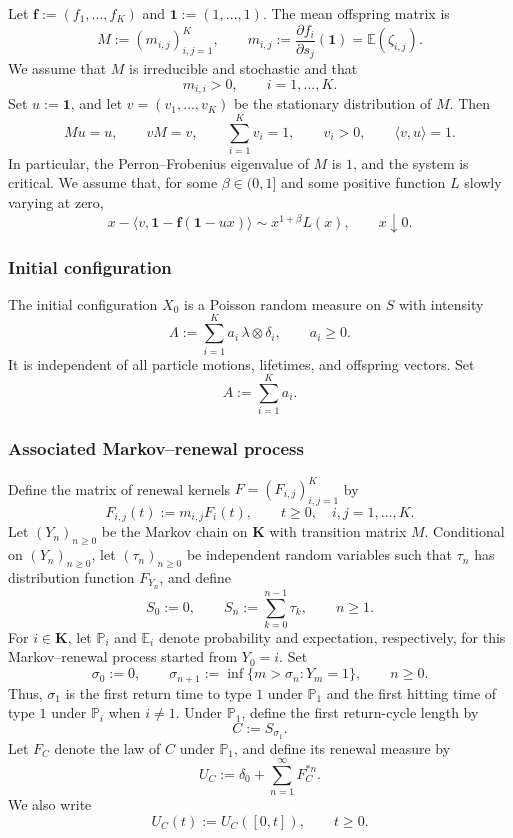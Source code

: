 \documentclass[reqno,final,11pt]{amsart}
\newcommand{\E}{\mathbb E}
\newcommand{\Pbb}{\mathbb P}
\newcommand{\Kk}{\mathbf K}
\newcommand{\one}{\mathbf 1}
\newcommand{\ip}[2]{\langle #1,#2\rangle}
\theoremstyle{plain}
\theoremstyle{definition}
\theoremstyle{remark}
\numberwithin{equation}{section}
\begin{document}
Let \(\mathbf f:=(f_1,\dots,f_K)\) and \(\one:=(1,\dots,1)\). The mean offspring matrix is
\[
  M:=(m_{i,j})_{i,j=1}^K,
  \qquad
  m_{i,j}:=\frac{\partial f_i}{\partial s_j}(\one)
  =\E(\zeta_{i,j}).
\]
We assume that \(M\) is irreducible and stochastic and that
\begin{equation}\label{eq:positive-diagonal}
  m_{i,i}>0,
  \qquad i=1,\dots,K.
\end{equation}
Set \(u:=\one\), and let \(v=(v_1,\dots,v_K)\) be the stationary distribution of \(M\). Then
\[
  Mu=u,\qquad vM=v,\qquad
  \sum_{i=1}^K v_i=1,\qquad v_i>0,\qquad
  \ip{v}{u}=1.
\]
In particular, the Perron--Frobenius eigenvalue of \(M\) is \(1\), and the system is critical. We assume that, for some \(\beta\in(0,1]\) and some positive function \(L\) slowly varying at zero,
\begin{equation}\label{eq:branching-condition}
  x-\ip{v}{\one-\mathbf f(\one-ux)}
  \sim x^{1+\beta}L(x),
  \qquad x\downarrow0.
\end{equation}

\subsubsection{Initial configuration}

The initial configuration \(X_0\) is a Poisson random measure on \(S\) with intensity
\begin{equation}\label{eq:initial-intensity}
  \Lambda:=\sum_{i=1}^K a_i\,\lambda\otimes\delta_i,
  \qquad a_i\ge0.
\end{equation}
It is independent of all particle motions, lifetimes, and offspring vectors. Set
\begin{equation}\label{eq:A-total}
  A:=\sum_{i=1}^K a_i.
\end{equation}

\subsubsection{Associated Markov--renewal process}
\label{sec:mixed-renewal-framework}

Define the matrix of renewal kernels \(F=(F_{i,j})_{i,j=1}^K\) by
\[
  F_{i,j}(t):=m_{i,j}F_i(t),
  \qquad t\ge0,\quad i,j=1,\dots,K.
\]
Let \((Y_n)_{n\ge0}\) be the Markov chain on \(\Kk\) with transition matrix \(M\). Conditional on \((Y_n)_{n\ge0}\), let \((\tau_n)_{n\ge0}\) be independent random variables such that \(\tau_n\) has distribution function \(F_{Y_n}\), and define
\[
  S_0:=0,\qquad
  S_n:=\sum_{k=0}^{n-1}\tau_k,
  \qquad n\ge1.
\]
For \(i\in\Kk\), let \(\Pbb_i\) and \(\E_i\) denote probability and expectation, respectively, for this Markov--renewal process started from \(Y_0=i\). Set
\[
  \sigma_0:=0,\qquad
  \sigma_{n+1}:=\inf\{m>\sigma_n:Y_m=1\},
  \qquad n\ge0.
\]
Thus, \(\sigma_1\) is the first return time to type \(1\) under \(\Pbb_1\) and the first hitting time of type \(1\) under \(\Pbb_i\) when \(i\ne1\). Under \(\Pbb_1\), define the first return-cycle length by
\[
  C:=S_{\sigma_1}.
\]
Let \(F_C\) denote the law of \(C\) under \(\Pbb_1\), and define its renewal measure by
\[
  U_C:=\delta_0+\sum_{n=1}^{\infty}F_C^{*n}.
\]
We also write
\[
  U_C(t):=U_C([0,t]),
  \qquad t\ge0.
\]
\end{document}
